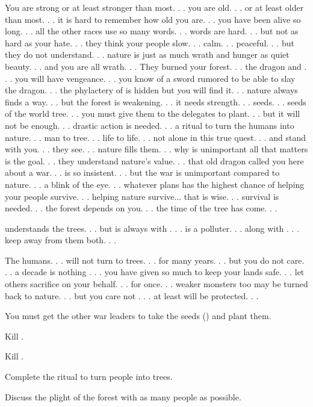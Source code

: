 \documentclass[char]{guildcamp2}
\begin{document}
\name{\cEnt{}}




You are strong or at least stronger than most. . . you are old. . . or at least older than most. . . it is hard to remember how old you are. . . you have been alive so long. . . all the other races use so many words. . . words are hard. . . but not as hard as your hate. . . they think your people slow. . . calm. . . peaceful. . . but they do not understand. . . nature is just as much wrath and hunger as quiet beauty. . . and you are all wrath. . . They burned your forest. . . \cRed{} the dragon and \cLich{}. . . you will have vengeance. . . you know of a sword rumored to be able to slay the dragon. . . the phylactery of \cLich{} is hidden but you will find it. . . nature always finds a way. . .  but the forest is weakening. . . it needs strength. . . seeds. . . seeds of the world tree. . . you must give them to the delegates to plant. . . but it will not be enough. . . drastic action is needed. . . a ritual to turn the humans into nature. . . man to tree. . . life to life. . . not alone in this true quest. . . \cTreeFae{} and \cTroll{} stand with you. . . they see. . . nature fills them. . . why is unimportant all that matters is the goal. . . they understand nature's value. . . that old dragon called you here about a war. . . \cOnyx{} is so insistent. . . but the war is unimportant compared to nature. . . a blink of the eye. . . whatever plans has the highest chance of helping your people survive. . . helping nature survive... that is wise. . . survival is needed. . . the forest depends on you. . . the time of the tree has come. . .

\cTreeFae{} understands the trees. . . but \cTreeFae{\they} is always with \cBabyFae{} . . . \cBabyFae{} is a polluter. . . along with \cBasilisk{} . . . keep \cTreeFae{} away from them both. . .

The humans. . . will not turn to trees. . . for many years. . . but you do not care. . . a decade is nothing . . . you have given so much to keep your lands safe. . . let others sacrifice on your behalf. . . for once. . . weaker monsters too may be turned back to nature. . . but you care not . . . \cTreeFae{} at least will be protected. . .

\begin{itemz}[Goals]
  \item You must get the other war leaders to take the seeds (\iSeedoftheWorldTree{}) and plant them.
  \item Kill \cRed{}.
	\item Kill \cLich{}.
  \item Complete the ritual to turn people into trees.
	\item Discuss the plight of the forest with as many people as possible.
\end{itemz}
\end{document}
